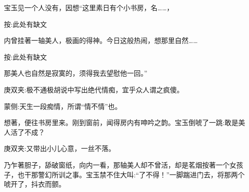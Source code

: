 \begin{parag}
    宝玉见一个人没有，因想“这里素日有个小书房，名……，\begin{subnote}按:此处有缺文\end{subnote}内曾挂著一轴美人，极画的得神。今日这般热闹，想那里自然……\begin{subnote}按:此处有缺文\end{subnote}那美人也自然是寂寞的，须得我去望慰他一回。”\begin{note}庚双夹:极不通极胡说中写出绝代情痴，宜乎众人谓之疯傻。\end{note}\begin{note}蒙侧:天生一段痴情，所谓“情不情”也。\end{note}想著，便往书房里来。刚到窗前，闻得房内有呻吟之韵。宝玉倒唬了一跳:敢是美人活了不成？\begin{note}庚双夹:又带出小儿心意，一丝不落。\end{note}乃乍著胆子，舔破窗纸，向内一看，那轴美人却不曾活，却是茗烟按著一个女孩子，也干那警幻所训之事。宝玉禁不住大叫:“了不得！”一脚踹进门去，将那两个唬开了，抖衣而颤。
\end{parag}


